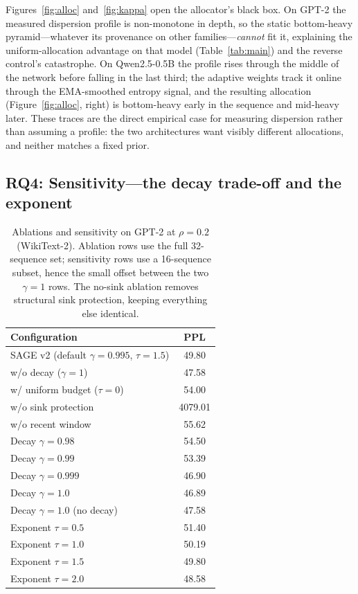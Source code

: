 Figures~\ref{fig:alloc} and~\ref{fig:kappa} open the allocator's black
box. On GPT-2 the measured dispersion profile is non-monotone in depth,
so the static bottom-heavy pyramid---whatever its provenance on other
families---\emph{cannot} fit it, explaining the uniform-allocation
advantage on that model (Table~\ref{tab:main}) and the reverse control's
catastrophe. On Qwen2.5-0.5B the profile rises through the middle of the
network before falling in the last third; the adaptive weights track it
online through the EMA-smoothed entropy signal, and the resulting
allocation (Figure~\ref{fig:alloc}, right) is bottom-heavy early in the
sequence and mid-heavy later. These traces are the direct empirical case
for measuring dispersion rather than assuming a profile: the two
architectures want visibly different allocations, and neither matches a
fixed prior.

\subsection{RQ4: Sensitivity---the decay trade-off and the exponent}
\label{sec:exp-sens}

\begin{table}[t]
\centering\small
\caption{Ablations and sensitivity on GPT-2 at $\rho=0.2$ (WikiText-2).
Ablation rows use the full 32-sequence set; sensitivity rows use a
16-sequence subset, hence the small offset between the two $\gamma{=}1$
rows. The no-sink ablation removes structural sink protection, keeping
everything else identical.}
\label{tab:sens}
\begin{tabular*}{0.86\columnwidth}{@{\extracolsep{\fill}} l c}
\toprule
Configuration & PPL \\
\midrule
SAGE v2 (default $\gamma{=}0.995$, $\tau{=}1.5$) & 49.80 \\
\;w/o decay ($\gamma{=}1$) & 47.58 \\
\;w/ uniform budget ($\tau{=}0$) & 54.00 \\
\;w/o sink protection & 4079.01 \\
\;w/o recent window & 55.62 \\
\midrule
Decay $\gamma{=}0.98$ & 54.50 \\
Decay $\gamma{=}0.99$ & 53.39 \\
Decay $\gamma{=}0.999$ & 46.90 \\
Decay $\gamma{=}1.0$ & 46.89 \\
Decay $\gamma{=}1.0$ (no decay) & 47.58 \\
Exponent $\tau{=}0.5$ & 51.40 \\
Exponent $\tau{=}1.0$ & 50.19 \\
Exponent $\tau{=}1.5$ & 49.80 \\
Exponent $\tau{=}2.0$ & 48.58 \\
\bottomrule
\end{tabular*}
\end{table}

